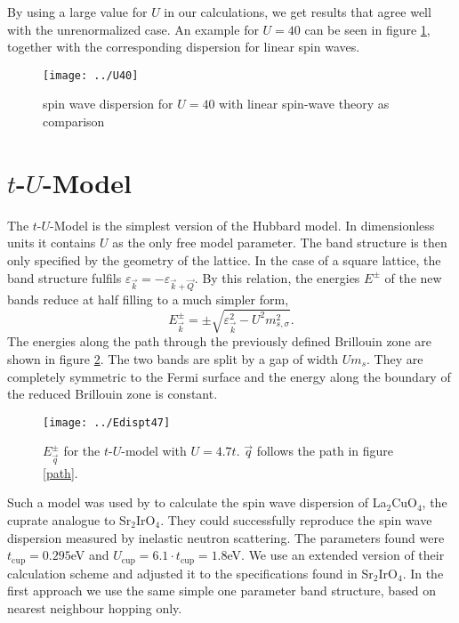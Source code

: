\documentclass[a4paper,12pt]{report}
\begin{document}
By using a large value for $U$ in our calculations, we get results that agree well with the unrenormalized case.
An example for $U=40$ can be seen in figure \ref{largeU}, together with the corresponding dispersion for linear spin waves.
%
\begin{figure}
 \begin{center}
  \texttt{[image: ../U40]}
  \caption{spin wave dispersion for $U=40$ with linear spin-wave theory as comparison}
 \label{largeU}
  \end{center}
\end{figure}
%
  
\newpage

\section{$t$-$U$-Model}

The $t$-$U$-Model is the simplest version of the Hubbard model.
In dimensionless units it contains $U$ as the only free model parameter.
The band structure is then only specified by the geometry of the lattice.
In the case of a square lattice, the band structure fulfils $\varepsilon_{\vec k} = -\varepsilon_{\vec k+\vec Q}$.
By this relation, the energies $E^{\pm}$ of the new bands reduce at half filling to a much simpler form,
\begin{equation}
 E^{\pm}_{\vec k} = \pm \sqrt{\varepsilon_{\vec k}^2 -U^2m_{s,\sigma}^2}.
\end{equation}
The energies along the path through the previously defined Brillouin zone are shown in figure \ref{Epmt47}.
The two bands are split by a gap of width $Um_s$. 
They are completely symmetric to the Fermi surface and the energy along the boundary of the reduced Brillouin zone is constant.
%
\begin{figure}
 \centering
 \texttt{[image: ../Edispt47]}
 \caption{$E^{\pm}_{\vec q}$ for the $t$-$U$-model with $U=4.7t$. $\vec q$ follows the path in figure \ref{path}. }
 \label{Epmt47}
\end{figure}


Such a model was used by \citet{PhysRevB.65.132404} to calculate the spin wave dispersion of La$_2$CuO$_4$, the cuprate analogue to Sr$_2$IrO$_4$.
They could successfully reproduce the spin wave dispersion measured by inelastic neutron scattering. 
The parameters found were $t_{\mathrm{cup}}=0.295$eV and $U_{\mathrm{cup}}=6.1\cdot t_{\mathrm{cup}}=1.8$eV. 
We use an extended version of their calculation scheme and adjusted it to the specifications found in Sr$_2$IrO$_4$.
In the first approach we  use the same simple one parameter band structure, based on nearest neighbour hopping only.
\end{document}
